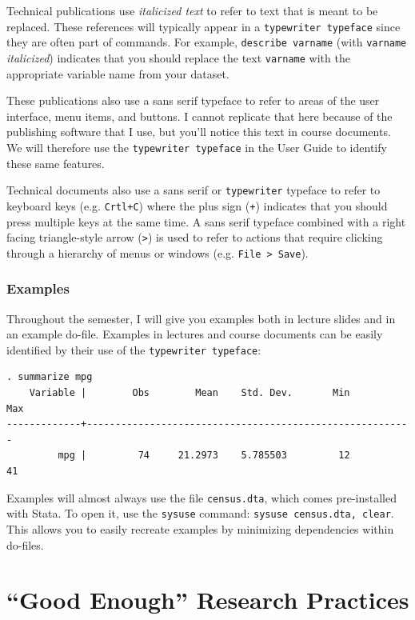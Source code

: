 \documentclass[]{book}
\begin{document}
Technical publications use \emph{italicized text} to refer to text that
is meant to be replaced. These references will typically appear in a
\texttt{typewriter\ typeface} since they are often part of commands. For
example, \texttt{describe\ varname} (with \texttt{varname}
\emph{italicized}) indicates that you should replace the text
\texttt{varname} with the appropriate variable name from your dataset.

These publications also use a sans serif typeface to refer to areas of
the user interface, menu items, and buttons. I cannot replicate that
here because of the publishing software that I use, but you'll notice
this text in course documents. We will therefore use the
\texttt{typewriter\ typeface} in the User Guide to identify these same
features.

Technical documents also use a sans serif or \texttt{typewriter}
typeface to refer to keyboard keys (e.g. \texttt{Crtl+C}) where the plus
sign (\texttt{+}) indicates that you should press multiple keys at the
same time. A sans serif typeface combined with a right facing
triangle-style arrow (\texttt{\textgreater{}}) is used to refer to
actions that require clicking through a hierarchy of menus or windows
(e.g. \texttt{File\ \textgreater{}\ Save}).

\subsection{Examples}\label{examples}

Throughout the semester, I will give you examples both in lecture slides
and in an example do-file. Examples in lectures and course documents can
be easily identified by their use of the \texttt{typewriter\ typeface}:

\begin{verbatim}
. summarize mpg
    Variable |        Obs        Mean    Std. Dev.       Min        Max
-------------+---------------------------------------------------------
         mpg |         74     21.2973    5.785503         12         41
\end{verbatim}

Examples will almost always use the file \texttt{census.dta}, which
comes pre-installed with Stata. To open it, use the \texttt{sysuse}
command: \texttt{sysuse\ census.dta,\ clear}. This allows you to easily
recreate examples by minimizing dependencies within do-files.

\chapter{\texorpdfstring{``Good Enough'' Research
Practices}{Good Enough Research Practices}}\label{good-enough-research-practices}
\end{document}
